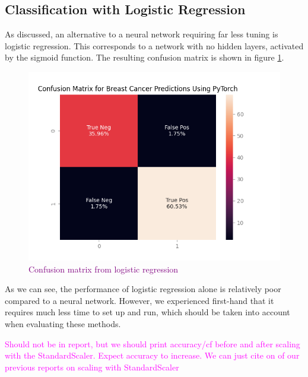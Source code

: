 
\subsection{Classification with Logistic Regression}
As discussed, an alternative to a neural network requiring far less tuning is logistic regression. This corresponds to a network with no hidden layers, activated by the sigmoid function. The resulting confusion matrix is shown in figure \ref{fig:logreg}. 
\begin{figure}
    \centering
    \includegraphics[width=0.5\linewidth]{figures/plots/logreg.png}
    \caption{\textcolor{purple}{Confusion matrix from logistic regression}}
    \label{fig:logreg}
\end{figure}

As we can see, the performance of logistic regression alone is relatively poor compared to a neural network. However, we experienced first-hand that it requires much less time to set up and run, which should be taken into account when evaluating these methods.

\textcolor{magenta}{Should not be in report, but we should print accuracy/cf before and after scaling with the StandardScaler. Expect accuracy to increase. We can just cite on of our previous reports on scaling with StandardScaler}



